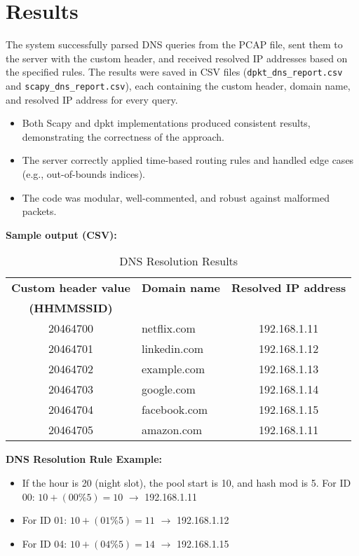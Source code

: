 \documentclass[10pt,a4paper]{report}
\begin{document}
\section{Results}

The system successfully parsed DNS queries from the PCAP file, sent them to the server with the custom header, and received resolved IP addresses based on the specified rules. The results were saved in CSV files (\texttt{dpkt\_dns\_report.csv} and \texttt{scapy\_dns\_report.csv}), each containing the custom header, domain name, and resolved IP address for every query.

\begin{itemize}
    \item Both Scapy and dpkt implementations produced consistent results, demonstrating the correctness of the approach.
    \item The server correctly applied time-based routing rules and handled edge cases (e.g., out-of-bounds indices).
    \item The code was modular, well-commented, and robust against malformed packets.
\end{itemize}

\textbf{Sample output (CSV):}
\begin{table}[htbp]
\centering
\caption{DNS Resolution Results}
\begin{tabular}{|c|l|c|}
\hline
\textbf{Custom header value} & \textbf{Domain name} & \textbf{Resolved IP address} \\
\textbf{(HHMMSSID)} & & \\
\hline
20464700 & netflix.com & 192.168.1.11 \\
20464701 & linkedin.com & 192.168.1.12 \\
20464702 & example.com & 192.168.1.13 \\
20464703 & google.com & 192.168.1.14 \\
20464704 & facebook.com & 192.168.1.15 \\
20464705 & amazon.com & 192.168.1.11 \\
\hline
\end{tabular}
\label{tab:dns_resolution}
\end{table}

\textbf{DNS Resolution Rule Example:}
\begin{itemize}
    \item If the hour is 20 (night slot), the pool start is 10, and hash mod is 5. For ID 00: $10 + (00 \% 5) = 10$ $\rightarrow$ 192.168.1.11
    \item For ID 01: $10 + (01 \% 5) = 11$ $\rightarrow$ 192.168.1.12
    \item For ID 04: $10 + (04 \% 5) = 14$ $\rightarrow$ 192.168.1.15
\end{itemize}
\end{document}
